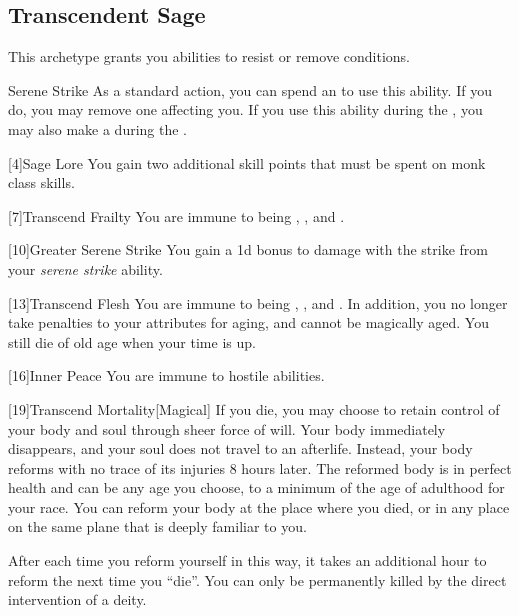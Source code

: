     \subsection{Transcendent Sage}
        This archetype grants you abilities to resist or remove conditions.

        \begin{ability}{Serene Strike}
            As a standard action, you can spend an  to use this ability.
            If you do, you may remove one  affecting you.
            If you use this ability during the , you may also make a  during the .
        \end{ability}

        [4]{Sage Lore} You gain two additional skill points that must be spent on monk class skills.

        [7]{Transcend Frailty}
        You are immune to being , , and .

        [10]{Greater Serene Strike} You gain a \plus1d bonus to damage with the strike from your \textit{serene strike} ability.

        [13]{Transcend Flesh}
        You are immune to being , , and .
        In addition, you no longer take penalties to your attributes for aging, and cannot be magically aged.
        You still die of old age when your time is up.

        [16]{Inner Peace}
        You are immune to hostile  abilities.

        [19]{Transcend Mortality}[Magical]
        If you die, you may choose to retain control of your body and soul through sheer force of will.
        Your body immediately disappears, and your soul does not travel to an afterlife.
        Instead, your body reforms with no trace of its injuries 8 hours later.
        The reformed body is in perfect health and can be any age you choose, to a minimum of the age of adulthood for your race.
        You can reform your body at the place where you died, or in any place on the same plane that is deeply familiar to you.

        After each time you reform yourself in this way, it takes an additional hour to reform the next time you ``die''.
        You can only be permanently killed by the direct intervention of a deity.

